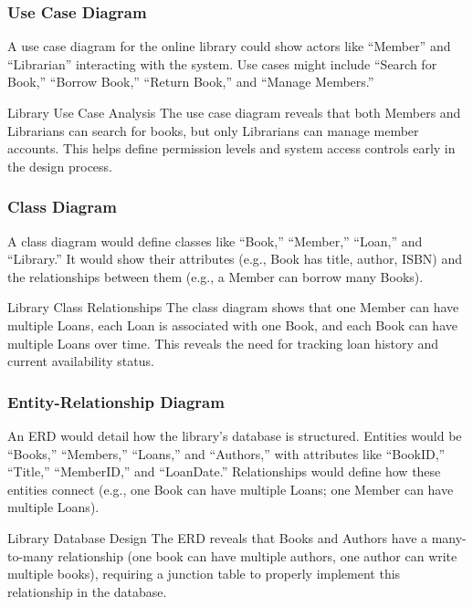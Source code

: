\subsubsection{Use Case Diagram}

A use case diagram for the online library could show actors like ``Member'' and ``Librarian'' interacting with the system. Use cases might include ``Search for Book,'' ``Borrow Book,'' ``Return Book,'' and ``Manage Members.''

\begin{examplecard}{Library Use Case Analysis}
  The use case diagram reveals that both Members and Librarians can search for books, but only Librarians can manage member accounts. This helps define permission levels and system access controls early in the design process.
\end{examplecard}

\subsubsection{Class Diagram}

A class diagram would define classes like ``Book,'' ``Member,'' ``Loan,'' and ``Library.'' It would show their attributes (e.g., Book has title, author, ISBN) and the relationships between them (e.g., a Member can borrow many Books).

\begin{examplecard}{Library Class Relationships}
  The class diagram shows that one Member can have multiple Loans, each Loan is associated with one Book, and each Book can have multiple Loans over time. This reveals the need for tracking loan history and current availability status.
\end{examplecard}

\subsubsection{Entity-Relationship Diagram}

An ERD would detail how the library's database is structured. Entities would be ``Books,'' ``Members,'' ``Loans,'' and ``Authors,'' with attributes like ``BookID,'' ``Title,'' ``MemberID,'' and ``LoanDate.'' Relationships would define how these entities connect (e.g., one Book can have multiple Loans; one Member can have multiple Loans).

\begin{examplecard}{Library Database Design}
  The ERD reveals that Books and Authors have a many-to-many relationship (one book can have multiple authors, one author can write multiple books), requiring a junction table to properly implement this relationship in the database.
\end{examplecard}

